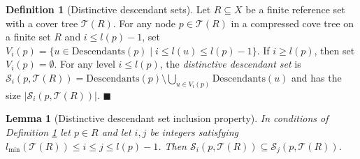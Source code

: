 \documentclass[a4paper,UKenglish,cleveref, autoref]{lipics-v2019}
\numberwithin{algocf}{section}
\theoremstyle{definition}
\newtheorem{dfn}[algocf]{Definition}
\theoremstyle{definition}
\theoremstyle{definition}
\theoremstyle{plain}
\newtheorem{lem}[algocf]{Lemma}
\newcommand{\Child}{\mathrm{Children}}
\newcommand{\Desc}{\mathrm{Descendants}}
\newcommand{\T}{\mathcal{T}}
\newcommand{\Sd}{\mathcal{S}}
\newcommand{\bs}{\hfill $\blacksquare$}
\begin{document}
\begin{dfn}[Distinctive descendant sets]
\label{dfn:distinctive_descendant_set}
Let $R\subseteq X$ be a finite reference set with a cover tree $\T(R)$. 
For any node $p \in \T(R)$ in a compressed cove tree on a finite set $R$ and $i \leq l(p) - 1$, set
$V_{i}(p) =  \{u \in \Desc(p) \mid i \leq l(u)\leq l(p) - 1\}.$
If $i \geq l(p)$, then set $V_i(p) = \emptyset$. 
For any level $i \leq l(p) $, the \emph{distinctive descendant set} is
$\Sd_i(p, \T(R)) =   \Desc(p) \setminus \bigcup\limits_{u \in V_{i}(p)} \Desc(u)$ and has the size $|\Sd_i(p, \T(R)) |$. 
\bs
\end{dfn}

\begin{lem}[Distinctive descendant set inclusion property]
\label{lem:distinctive_descendant_inclusion}
In conditions of Definition \ref{dfn:distinctive_descendant_set} let $p \in R$ and let $i,j$ be integers satisfying
$l_{\min}(\T(R)) \leq i \leq j \leq l(p) - 1$.
Then $\Sd_i(p, \T(R)) \subseteq \Sd_j(p, \T(R))$.
\end{lem}



\end{document}

